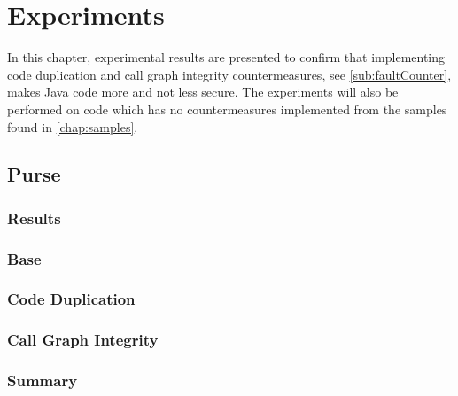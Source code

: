\chapter{Experiments}
In this chapter, experimental results are presented to confirm that implementing code duplication and call graph integrity countermeasures, see \cref{sub:faultCounter}, makes Java code more and not less secure. The experiments will also be performed on code which has no countermeasures implemented from the \jc samples found in \cref{chap:samples}.
%
\section{\jc Purse}

\subsection*{Results}

\subsection{Base}

\subsection{Code Duplication}

\subsection{Call Graph Integrity}

\subsection{Summary}



